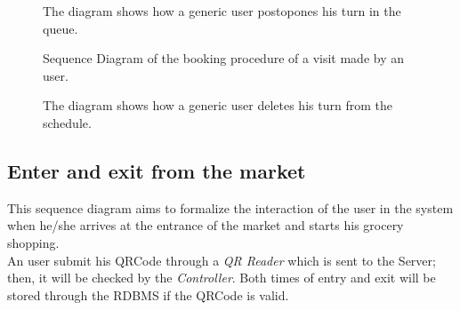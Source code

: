 \begin{figure}[H]
  \label{PostponeReservationSD}
  \centering
    \caption{The diagram shows how a generic user postopones his turn in the queue. }
\end{figure} 


\begin{figure}[H]
  \label{VisitSD}
  \centering
    \caption{Sequence Diagram of the booking procedure of a visit made by an user.}
\end{figure} 




\begin{figure}[H]
  \label{DeleteVisitSD}
  \centering
    \caption{The diagram shows how a generic user deletes his turn from the schedule.}
\end{figure} 


\subsection{Enter and exit from the market}
This sequence diagram aims to formalize the interaction of the user in the system when he/she arrives at the entrance of the market and starts his grocery shopping.\\
An user submit his QRCode through a \textit{QR Reader} which is sent to the Server; then, it will be checked by the \textit{Controller}. Both times of entry and exit will be stored through the RDBMS if the QRCode is valid.

